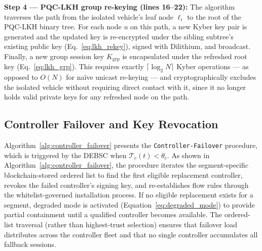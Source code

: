 \documentclass[12pt, a4paper]{report}
\begin{document}
\textbf{Step 4 — PQC-LKH group re-keying (lines 16--22):} The algorithm
traverses the path from the isolated vehicle's leaf node $\ell_i$ to the root
of the PQC-LKH binary tree. For each node $u$ on this path, a new Kyber key
pair is generated and the updated key is re-encrypted under the sibling
subtree's existing public key (Eq.~\eqref{eq:lkh_rekey}), signed with
Dilithium, and broadcast. Finally, a new group session key $K_{\text{grp}}$ is
encapsulated under the refreshed root key (Eq.~\eqref{eq:lkh_grp}). This
requires exactly $\lceil \log_2 N \rceil$ Kyber operations — as opposed to
$O(N)$ for naïve unicast re-keying — and cryptographically excludes the
isolated vehicle without requiring direct contact with it, since it no longer
holds valid private keys for any refreshed node on the path.

\subsection{Controller Failover and Key Revocation}
\label{sec:alg_failover}

Algorithm~\ref{alg:controller_failover} presents the
\texttt{Controller-Failover} procedure, which is triggered by
the DEBSC when $\mathcal{T}_c(t) < \theta_c$. As shown in
Algorithm~\ref{alg:controller_failover}, the procedure iterates
the segment-specific blockchain-stored ordered list to find the
first eligible replacement controller, revokes the failed
controller's signing key, and re-establishes flow rules through
the whitelist-governed installation process. If no eligible
replacement exists for a segment, degraded mode is activated
(Equation~\eqref{eq:degraded_mode}) to provide partial
containment until a qualified controller becomes available.
The ordered-list traversal (rather than highest-trust selection)
ensures that failover load distributes across the controller
fleet and that no single controller accumulates all fallback
sessions.
\end{document}
